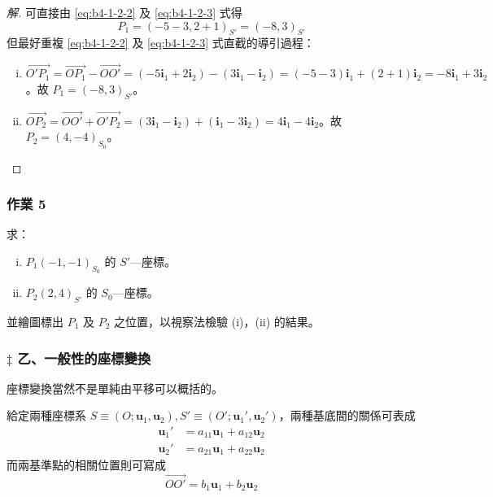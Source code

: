 \begin{proof}[解]
可直接由 \eqref{eq:b4-1-2-2} 及 \eqref{eq:b4-1-2-3} 式得
\[ P_1 = (-5-3, 2+1)_{S'} = (-8, 3)_{S'} \]
但最好重複 \eqref{eq:b4-1-2-2} 及 \eqref{eq:b4-1-2-3} 式直截的導引過程：
\begin{enumerate}[(i)]
  \item $\vec{O'P_1} = \vec{OP_1} - \vec{OO'} = (-5\mathbf{i}_1 + 2\mathbf{i}_2) - (3\mathbf{i}_1 - \mathbf{i}_2) = (-5-3)\mathbf{i}_1 + (2+1)\mathbf{i}_2 = -8\mathbf{i}_1 + 3\mathbf{i}_2$。故 $P_1 = (-8, 3)_{S'}$。
  \item $\vec{OP_2} = \vec{OO'} + \vec{O'P_2} = (3\mathbf{i}_1 - \mathbf{i}_2) + (\mathbf{i}_1 - 3\mathbf{i}_2) = 4\mathbf{i}_1 - 4\mathbf{i}_2$。故 $P_2 = (4, -4)_{S_0}$。
\end{enumerate}
\end{proof}

\subsubsection*{作業 5}
求：
\begin{enumerate}[(i)]
  \item $P_1(-1, -1)_{S_0}$ 的 $S'$---座標。
  \item $P_2(2, 4)_{S'}$ 的 $S_0$---座標。
\end{enumerate}
並繪圖標出 $P_1$ 及 $P_2$ 之位置，以視察法檢驗 (i)，(ii) 的結果。

\subsubsection*{$\ddagger$ 乙、一般性的座標變換}

座標變換當然不是單純由平移可以概括的。

給定兩種座標系 $S \equiv (O; \mathbf{u}_1, \mathbf{u}_2), S' \equiv (O'; \mathbf{u}_1', \mathbf{u}_2')$，兩種基底間的關係可表成
\begin{align}
\mathbf{u}_1' &= a_{11} \mathbf{u}_1 + a_{12} \mathbf{u}_2 \label{eq:b4-1-2-4} \\
\mathbf{u}_2' &= a_{21} \mathbf{u}_1 + a_{22} \mathbf{u}_2 \nonumber
\end{align}
而兩基準點的相關位置則可寫成
\begin{equation}
\vec{OO'} = b_1 \mathbf{u}_1 + b_2 \mathbf{u}_2 \label{eq:b4-1-2-4p}
\end{equation}

